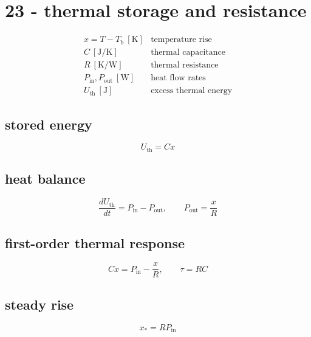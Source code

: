 \section*{23 - thermal storage and resistance}

\[
\begin{array}{ll}x=T-T_{\mathrm b}\ [\mathrm K]&\text{temperature rise}\\[0.6em]C\ [\mathrm{J/K}]&\text{thermal capacitance}\\[0.6em]R\ [\mathrm{K/W}]&\text{thermal resistance}\\[0.6em]P_{\mathrm{in}},P_{\mathrm{out}}\ [\mathrm W]&\text{heat flow rates}\\[0.6em]U_{\mathrm{th}}\ [\mathrm J]&\text{excess thermal energy}\end{array}
\]

\subsection*{stored energy}
\[
\displaystyle U_{\mathrm{th}}=Cx
\]

\subsection*{heat balance}
\[
\displaystyle \frac{dU_{\mathrm{th}}}{dt}=P_{\mathrm{in}}-P_{\mathrm{out}},\qquad P_{\mathrm{out}}=\frac xR
\]

\subsection*{first-order thermal response}
\[
\displaystyle C\dot x=P_{\mathrm{in}}-\frac xR,\qquad\tau=RC
\]

\subsection*{steady rise}
\[
\displaystyle x_*=RP_{\mathrm{in}}
\]
